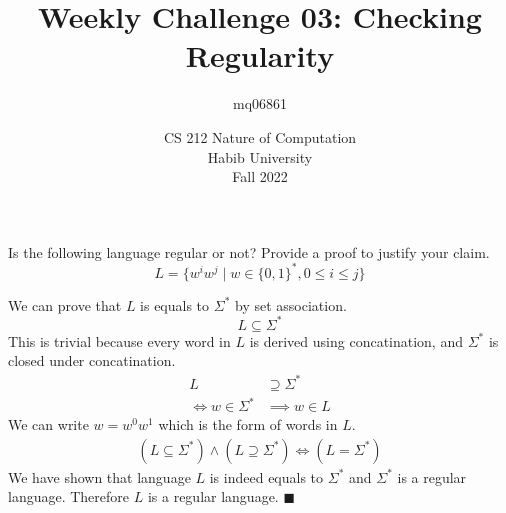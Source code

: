 \documentclass[a4paper]{exam}
\title{Weekly Challenge 03: Checking Regularity}
\author{mq06861} %
\date{CS 212 Nature of Computation\\Habib University\\Fall 2022}
\begin{document}
\maketitle

\begin{questions}


	Is the following language regular or not? Provide a proof to justify your claim.
	\[L = \{ w^iw^j \mid w\in\{0,1\}^*, 0 \leq i \leq j \}\]

	\begin{solution}
		We can prove that \(L\) is equals to \(\Sigma^{*}\) by set association.
		\[L\subseteq \Sigma^{*}\]
		This is trivial because every word in \(L\) is derived using concatination, and \(\Sigma^{*}\) is closed under concatination.
		\begin{align*}
			L                   & \supseteq \Sigma^{*} \\
			\iff w\in\Sigma^{*} & \implies w\in L
		\end{align*}
		We can write \(w=w^{0}w^{1}\) which is the form of words in \(L\).
		\begin{align*}
			(L\subseteq\Sigma^{*})\land(L\supseteq\Sigma^{*})\iff (L=\Sigma^{*})
		\end{align*}
		We have shown that language \(L\) is indeed equals to \(\Sigma^{*}\) and \(\Sigma^{*}\) is a regular language. Therefore \(L\) is a regular language.
		\center\(\blacksquare\)
	\end{solution}
\end{questions}
\end{document}
